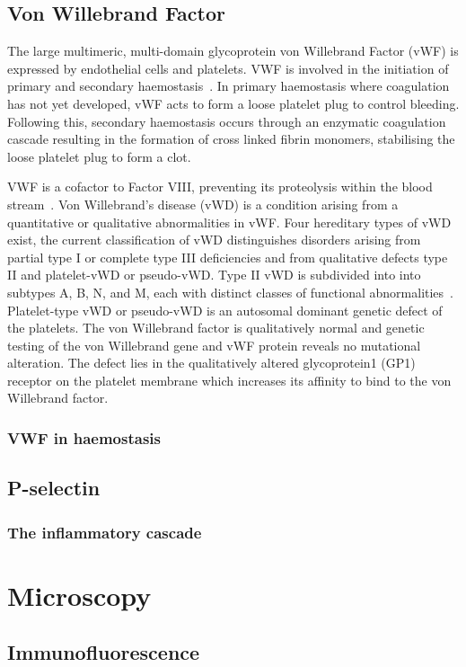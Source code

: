 \subsection{Von Willebrand Factor}
The large multimeric, multi-domain glycoprotein von Willebrand Factor (vWF) is expressed by endothelial cells and platelets. VWF is involved in the initiation of primary and secondary haemostasis~\cite{Metcalf2008}. In primary haemostasis where coagulation has not yet developed, vWF acts to form a loose platelet plug to control bleeding. Following this, secondary haemostasis occurs through an enzymatic coagulation cascade resulting in the formation of cross linked fibrin monomers, stabilising the loose platelet plug to form a clot.

VWF is a cofactor to Factor VIII, preventing its proteolysis within the blood stream~\cite{Sadler1998}. Von Willebrand's disease (vWD) is a condition arising from a quantitative or qualitative abnormalities in vWF. Four hereditary types of vWD exist, the current classification of vWD distinguishes disorders arising from partial type I or complete type III deficiencies and from qualitative defects type II and platelet-vWD or pseudo-vWD. Type II vWD is subdivided into into subtypes A, B, N, and M, each with distinct classes of functional abnormalities~\cite{Ewenstein1997}. Platelet-type vWD or pseudo-vWD is an autosomal dominant genetic defect of the platelets. The von Willebrand factor is qualitatively normal and genetic testing of the von Willebrand gene and vWF protein reveals no mutational alteration. The defect lies in the qualitatively altered glycoprotein1 (GP1) receptor on the platelet membrane which increases its affinity to bind to the von Willebrand factor. 
\subsubsection{VWF in haemostasis}

\subsection{P-selectin}
\subsubsection{The inflammatory cascade}

\section{Microscopy}
\subsection{Immunofluorescence}
